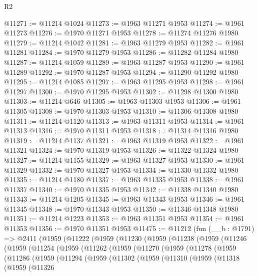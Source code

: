 \begin{lexlean}{R2}
\begin{coremodule}
@11271 := @11214 @1024
@11273 := @1963 @11271 @1953
@11274 := @1961 @11273
@11276 := @1970 @11271 @1953
@11278 := @11274 @11276 @1980
@11279 := @11214 @1042
@11281 := @1963 @11279 @1953
@11282 := @1961 @11281
@11284 := @1970 @11279 @1953
@11286 := @11282 @11284 @1980
@11287 := @11214 @1059
@11289 := @1963 @11287 @1953
@11290 := @1961 @11289
@11292 := @1970 @11287 @1953
@11294 := @11290 @11292 @1980
@11295 := @11214 @1085
@11297 := @1963 @11295 @1953
@11298 := @1961 @11297
@11300 := @1970 @11295 @1953
@11302 := @11298 @11300 @1980
@11303 := @11214 @646
@11305 := @1963 @11303 @1953
@11306 := @1961 @11305
@11308 := @1970 @11303 @1953
@11310 := @11306 @11308 @1980
@11311 := @11214 @1120
@11313 := @1963 @11311 @1953
@11314 := @1961 @11313
@11316 := @1970 @11311 @1953
@11318 := @11314 @11316 @1980
@11319 := @11214 @1137
@11321 := @1963 @11319 @1953
@11322 := @1961 @11321
@11324 := @1970 @11319 @1953
@11326 := @11322 @11324 @1980
@11327 := @11214 @1155
@11329 := @1963 @11327 @1953
@11330 := @1961 @11329
@11332 := @1970 @11327 @1953
@11334 := @11330 @11332 @1980
@11335 := @11214 @1180
@11337 := @1963 @11335 @1953
@11338 := @1961 @11337
@11340 := @1970 @11335 @1953
@11342 := @11338 @11340 @1980
@11343 := @11214 @1205
@11345 := @1963 @11343 @1953
@11346 := @1961 @11345
@11348 := @1970 @11343 @1953
@11350 := @11346 @11348 @1980
@11351 := @11214 @1223
@11353 := @1963 @11351 @1953
@11354 := @1961 @11353
@11356 := @1970 @11351 @1953
@11475 := @11212
    (fun (__b : @1791) =>
    @2411
      (@1959
        (@11222
          (@1959
            (@11230
              (@1959
                (@11238
                  (@1959
                    (@11246
                      (@1959
                        (@11254
                          (@1959
                            (@11262
                              (@1959
                                (@11270
                                  (@1959
                                    (@11278
                                      (@1959
                                        (@11286
                                          (@1959
                                            (@11294
                                              (@1959
                                                (@11302
                                                  (@1959
                                                    (@11310
                                                      (@1959
                                                        (@11318
                                                          (@1959
                                                            (@11326

\end{coremodule}
\end{lexlean}
